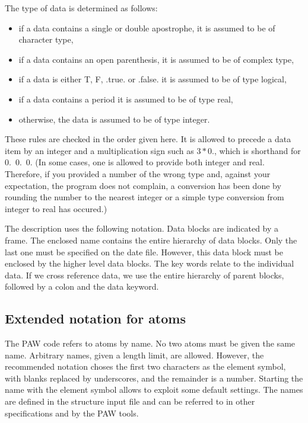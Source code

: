 \documentclass[final,12pt]{article}
\begin{document}
The type of data is determined as follows:
\begin{itemize}
\item if a data contains a single or double apostrophe, it is
  assumed to be of character type,
\item if a data contains an open parenthesis, it is assumed to be of
  complex type,
\item if a data is either T, F, .true. or .false. it is assumed to be of
  type logical,
\item if a data contains a period it is assumed to be of type real,
\item otherwise, the data is assumed to be of type integer.
\end{itemize}
These rules are checked in the order given here.  It is allowed to
precede a data item by an integer and a multiplication sign such as
$3*0.$, which is shorthand for 0.\ 0.\ 0. (In some cases, one is
allowed to provide both integer and real. Therefore, if you provided a
number of the wrong type and, against your expectation, the program
does not complain, a conversion has been done by rounding the number
to the nearest integer or a simple type conversion from integer to
real has occured.)

The description uses the following notation. Data blocks are
indicated by a frame. The enclosed name contains the entire
hierarchy of data blocks. Only the last one must be specified on the
date file. However, this data block must be enclosed by the higher
level data blocks. The key words relate to the individual data. If we
cross reference data, we use the entire hierarchy of parent
blocks, followed by a colon and the data keyword.

%
\subsection{Extended notation for atoms}
\label{sec:extendedatomnotation}

The PAW code refers to atoms by name. No two atoms must be given the
same name. Arbitrary names, given a length limit, are allowed.
However, the recommended notation choses the first two characters as
the element symbol, with blanks replaced by underscores, and the
remainder is a number. Starting the name with the element symbol
allows to exploit some default settings. The names are defined in the
structure input file and can be referred to in other specifications
and by the PAW tools.
\end{document}
